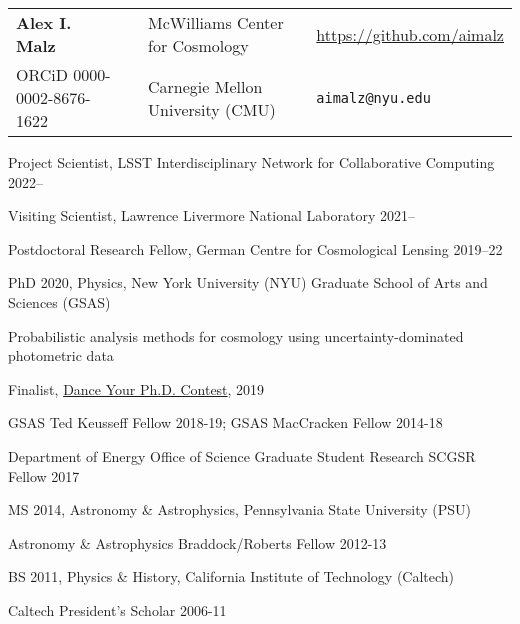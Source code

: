 \documentclass[11pt,letterpaper]{article}
\begin{document}
\sloppy\sloppypar\raggedbottom\frenchspacing
\setlength{\tabcolsep}{0.25cm}
\begin{tabular}{lllll}
\noindent\textbf{\Large Alex I. Malz}            & & {\small McWilliams Center for Cosmology} & & {\url{https://github.com/aimalz}} \\%
\noindent ORCiD 0000-0002-8676-1622\deemph{\today} & & {\small Carnegie Mellon University (CMU)} & & \texttt{aimalz@nyu.edu}    \\%
\end{tabular}\vspace{1ex} 

\begin{list}{}{\malzlist}
	\item Project Scientist, LSST Interdisciplinary Network for Collaborative Computing 2022--
	\item Visiting Scientist, Lawrence Livermore National Laboratory 2021--
	\item Postdoctoral Research Fellow, German Centre for Cosmological Lensing 2019--22
\end{list}%

\begin{list}{}{\malzlist}
\item
PhD 2020, Physics, New York University (NYU) Graduate School of Arts and Sciences (GSAS)
	\begin{list}{}{\malzlist}
		\item {} Probabilistic analysis methods for cosmology using uncertainty-dominated photometric data  
		\item Finalist, \href{https://youtu.be/vKs3PYqZWg8}{Dance Your Ph.D. Contest}, 2019
		\item GSAS Ted Keusseff Fellow 2018-19; GSAS MacCracken Fellow 2014-18
		\item
		Department of Energy Office of Science Graduate Student Research SCGSR Fellow 2017
	\end{list}{}
\item
MS 2014, Astronomy \& Astrophysics, Pennsylvania State University (PSU)
	\begin{list}{}{\malzlist}
		\item Astronomy \& Astrophysics Braddock/Roberts Fellow 2012-13
	\end{list}
\item
BS 2011, Physics \& History, California Institute of Technology (Caltech)
	\begin{list}{}{\malzlist}
		\item Caltech President's Scholar 2006-11
	\end{list}
\end{list}
\end{document}
